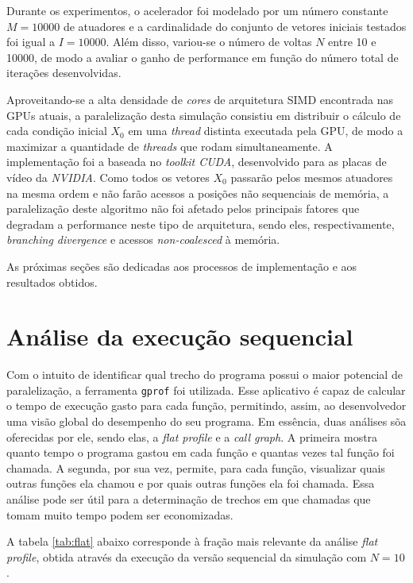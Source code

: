 \documentclass[12pt]{article}
\begin{document}
Durante os experimentos, o acelerador foi modelado por um número
constante \(M = 10000\) de atuadores e a cardinalidade do conjunto de vetores
iniciais testados foi igual a \(I = 10000\). Além disso, variou-se o número de
voltas \(N\) entre 10 e 10000, de modo a avaliar o ganho de performance em
função do número total de iterações desenvolvidas.

Aproveitando-se a alta densidade de \textit{cores} de arquitetura SIMD
encontrada nas GPUs atuais, a paralelização desta simulação consistiu em
distribuir o cálculo de cada condição inicial \(X_0\) em uma \textit{thread}
distinta executada pela GPU, de modo a maximizar a quantidade de
\textit{threads} que rodam simultaneamente. A implementação foi a baseada no
\textit{toolkit CUDA}, desenvolvido para as placas de vídeo da \textit{NVIDIA}.
Como todos os vetores \(X_0\) passarão pelos mesmos atuadores na mesma ordem e
não farão acessos a posições não sequenciais de memória, a paralelização deste
algoritmo não foi afetado pelos principais fatores que degradam a performance
neste tipo de arquitetura, sendo eles, respectivamente, \textit{branching
divergence} e acessos \textit{non-coalesced} à memória.

As próximas seções são dedicadas aos processos de implementação e aos resultados
obtidos.

\section {Análise da execução sequencial}

Com o intuito de identificar qual trecho do programa possui o maior potencial de
paralelização, a ferramenta \texttt{gprof} foi utilizada. Esse aplicativo é
capaz de calcular o tempo de execução gasto para cada função, permitindo, assim,
ao desenvolvedor uma visão global do desempenho do seu programa. Em
essência, duas análises sõa oferecidas por ele, sendo elas, a \textit {flat
profile} e a \textit{call graph}. A primeira mostra quanto tempo o programa
gastou em cada função e quantas vezes tal função foi chamada. A segunda, por sua
vez, permite, para cada função, visualizar quais outras funções ela chamou
e por quais outras funções ela foi chamada. Essa análise pode ser útil para a
determinação de trechos em que chamadas que tomam muito tempo podem ser
economizadas.

A tabela \ref{tab:flat} abaixo corresponde à fração mais relevante da análise
\textit{flat profile}, obtida através da execução da versão sequencial da
simulação com \(N = 10\). 
\end{document}
